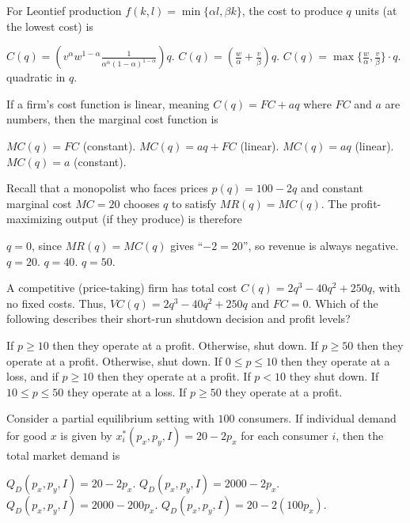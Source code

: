 \documentclass[addpoints,answers,12pt]{exam}
\begin{document}
\begin{questions}
\question[1] For Leontief production $f(k,l)=\min\{\alpha l,\beta k\}$, the cost to produce $q$ units (at the lowest cost) is
\begin{choices}
    \choice $C(q) = \left(v^\alpha w^{1-\alpha}\frac{1}{\alpha^\alpha(1-\alpha)^{1-\alpha}}\right)q$.
    \CorrectChoice $C(q) = \left(\frac{w}{\alpha}+\frac{v}{\beta}\right) q$.
    \choice $C(q)=\max\{\frac{w}{\alpha},\frac{v}{\beta}\}\cdot q$.
    \choice quadratic in $q$.
\end{choices}

\question[1] If a firm's cost function is linear, meaning $C(q)=FC + aq$ where $FC$ and $a$ are numbers, then the marginal cost function is
\begin{choices}
    \choice $MC(q)=FC$ (constant).
    \choice $MC(q)=aq + FC$ (linear).
    \choice $MC(q)=aq$ (linear).
    \CorrectChoice $MC(q)=a$ (constant).
\end{choices}

\newpage
\question[1] Recall that a monopolist who faces prices $p(q)=100-2q$ and constant marginal cost $MC=20$ chooses $q$ to satisfy $MR(q)=MC(q)$. The profit-maximizing output (if they produce) is therefore
\begin{choices}
    \choice $q=0$, since $MR(q)=MC(q)$ gives ``$-2=20$'', so revenue is always negative.
    \CorrectChoice $q=20$.
    \choice $q=40$.
    \choice $q=50$.
\end{choices}

\question[1] A competitive (price-taking) firm has total cost $C(q)=2q^3 -40 q^2 + 250q$, with no fixed costs. Thus, $VC(q)=2q^3-40q^2+250q$ and $FC=0$. Which of the following describes their short-run shutdown decision and profit levels?
\begin{choices}
    \choice If $p\ge 10$ then they operate at a profit. Otherwise, shut down.
    \CorrectChoice If $p\ge 50$ then they operate at a profit. Otherwise, shut down.
    \choice If $0\le p\le 10$ then they operate at a loss, and if $p\ge 10$ then they operate at a profit.
    \choice If $p< 10$ they shut down. If $10\le p\le 50$ they operate at a loss. If $p\ge 50$ they operate at a profit.
\end{choices}

\question[1] Consider a partial equilibrium setting with $100$ consumers. If individual demand for good $x$ is given by $x_i^*(p_x,p_y,I)=20 - 2p_x$ for each consumer $i$, then the total market demand is
\begin{choices}
    \choice $Q_D(p_x,p_y,I)=20-2p_x$.
    \choice $Q_D(p_x,p_y,I)=2000 - 2 p_x$.
    \CorrectChoice $Q_D(p_x,p_y,I)=2000-200p_x$.
    \choice $Q_D(p_x,p_y,I)=20-2(100p_x)$.
\end{choices}


\end{questions}
\end{document}
